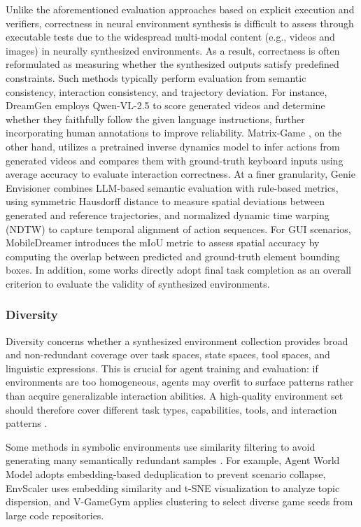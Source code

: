 Unlike the aforementioned evaluation approaches based on explicit execution and verifiers, correctness in neural environment synthesis is difficult to assess through executable tests due to the widespread multi-modal content (e.g., videos and images) in neurally synthesized environments. As a result, correctness is often reformulated as measuring whether the synthesized outputs satisfy predefined constraints. Such methods typically perform evaluation from semantic consistency, interaction consistency, and trajectory deviation. For instance, DreamGen \cite{DreamGen} employs Qwen-VL-2.5 to score generated videos and determine whether they faithfully follow the given language instructions, further incorporating human annotations to improve reliability. Matrix-Game \cite{Matrix-Game}, on the other hand, utilizes a pretrained inverse dynamics model to infer actions from generated videos and compares them with ground-truth keyboard inputs using average accuracy to evaluate interaction correctness. At a finer granularity, Genie Envisioner \cite{Genie_Envisioner} combines LLM-based semantic evaluation with rule-based metrics, using symmetric Hausdorff distance to measure spatial deviations between generated and reference trajectories, and normalized dynamic time warping (NDTW) to capture temporal alignment of action sequences. For GUI scenarios, MobileDreamer \cite{MobileDreamer} introduces the mIoU metric to assess spatial accuracy by computing the overlap between predicted and ground-truth element bounding boxes. In addition, some works \cite{WKM, Dyna-Think} directly adopt final task completion as an overall criterion to evaluate the validity of synthesized environments.

\subsubsection{Diversity}

Diversity concerns whether a synthesized environment collection provides broad and non-redundant coverage over task spaces, state spaces, tool spaces, and linguistic expressions. This is crucial for agent training and evaluation: if environments are too homogeneous, agents may overfit to surface patterns rather than acquire generalizable interaction abilities. A high-quality environment set should therefore cover different task types, capabilities, tools, and interaction patterns \cite{SWE-World}.

Some methods in symbolic environments use similarity filtering to avoid generating many semantically redundant samples \cite{InfiniteWeb}. For example, Agent World Model \cite{Agent_world_model} adopts embedding-based deduplication to prevent scenario collapse, EnvScaler \cite{EnvScaler} uses embedding similarity and t-SNE visualization to analyze topic dispersion, and V-GameGym \cite{V-GameGym} applies clustering to select diverse game seeds from large code repositories.

